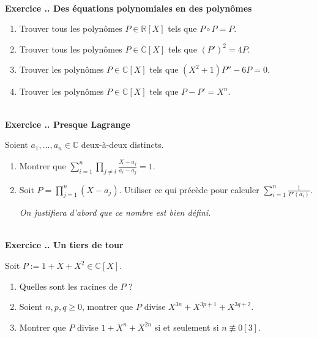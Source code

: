 \documentclass{article}
\newcommand{\mb}[1]{\mathbb{#1}}
\newcounter{exo}
\newcommand{\exercice}[1][\null]{\textbf{\\ Exercice \thesection.\theexo. #1} \addtocounter{exo}{1}}
\begin{document}
\exercice[Des équations polynomiales en des polynômes]

\begin{enumerate}

\item Trouver tous les polynômes $P \in \mb{R}[X]$ tels que $P \circ P = P$.

\item Trouver tous les polynômes $P \in \mb{C}[X]$ tels que $(P')^2 = 4P$.

\item Trouver les polynômes $P \in \mb{C}[X]$ tels que $(X^2+1)P'' - 6P =0$.

\item Trouver les polynômes $P \in \mb{C}[X]$ tels que $P - P' = X^n$.

\end{enumerate}


\exercice[Presque Lagrange]

Soient $a_1, \dots, a_n \in \mb{C}$ deux-à-deux distincts.

\begin{enumerate}

\item Montrer que $\displaystyle \sum_{i=1}^n \prod_{j \neq i} \frac{X - a_j}{a_i - a_j} = 1$.

\item Soit $P = \prod_{j=1}^n (X-a_j)$. Utiliser ce qui précède pour calculer $\sum_{i=1}^n \frac{1}{P'(a_i)}$.

\emph{On justifiera d'abord que ce nombre est bien défini.}

\end{enumerate}



\exercice[Un tiers de tour]

Soit $P := 1 + X + X^2 \in \mb{C}[X]$.

\begin{enumerate}

\item Quelles sont les racines de $P$ ?

\item Soient $n,p,q \ge 0$, montrer que $P$ divise $X^{3n} + X^{3p+1} + X^{3q+2}$.

\item Montrer que $P$ divise $1 + X^{n} + X^{2n}$ si et seulement si $n \not \equiv 0 [3]$.

\end{enumerate}
\end{document}
